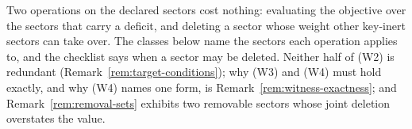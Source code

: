 
Two operations on the declared sectors cost nothing: evaluating the
objective over the sectors that carry a deficit, and deleting a sector whose
weight other key-inert sectors can take over. The classes below name the
sectors each operation applies to, and the checklist says when a sector may
be deleted. Neither half of (W2) is redundant
(Remark~\ref{rem:target-conditions}); why (W3) and (W4) must hold exactly,
and why (W4) names one form, is Remark~\ref{rem:witness-exactness}; and
Remark~\ref{rem:removal-sets} exhibits two removable sectors whose joint
deletion overstates the value.

